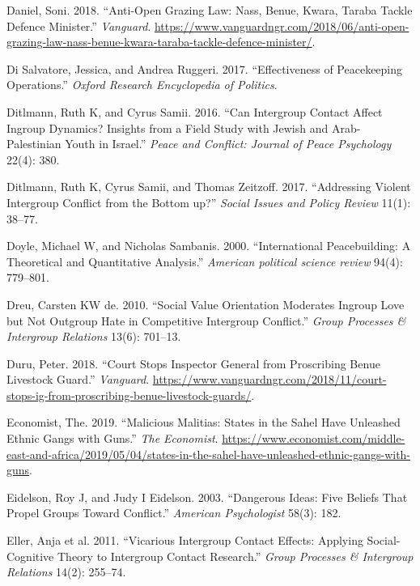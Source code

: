 \documentclass[11pt]{article}
\begin{document}
\hypertarget{ref-daniel2018anti}{}
Daniel, Soni. 2018. ``Anti-Open Grazing Law: Nass, Benue, Kwara, Taraba
Tackle Defence Minister.'' \emph{Vanguard}.
\url{https://www.vanguardngr.com/2018/06/anti-open-grazing-law-nass-benue-kwara-taraba-tackle-defence-minister/}.

\hypertarget{ref-di2017effectiveness}{}
Di Salvatore, Jessica, and Andrea Ruggeri. 2017. ``Effectiveness of
Peacekeeping Operations.'' \emph{Oxford Research Encyclopedia of
Politics}.

\hypertarget{ref-ditlmann2016can}{}
Ditlmann, Ruth K, and Cyrus Samii. 2016. ``Can Intergroup Contact Affect
Ingroup Dynamics? Insights from a Field Study with Jewish and
Arab-Palestinian Youth in Israel.'' \emph{Peace and Conflict: Journal of
Peace Psychology} 22(4): 380.

\hypertarget{ref-ditlmann2017addressing}{}
Ditlmann, Ruth K, Cyrus Samii, and Thomas Zeitzoff. 2017. ``Addressing
Violent Intergroup Conflict from the Bottom up?'' \emph{Social Issues
and Policy Review} 11(1): 38--77.

\hypertarget{ref-doyle2000international}{}
Doyle, Michael W, and Nicholas Sambanis. 2000. ``International
Peacebuilding: A Theoretical and Quantitative Analysis.'' \emph{American
political science review} 94(4): 779--801.

\hypertarget{ref-dreu2010social}{}
Dreu, Carsten KW de. 2010. ``Social Value Orientation Moderates Ingroup
Love but Not Outgroup Hate in Competitive Intergroup Conflict.''
\emph{Group Processes \& Intergroup Relations} 13(6): 701--13.

\hypertarget{ref-duru2018court}{}
Duru, Peter. 2018. ``Court Stops Inspector General from Proscribing
Benue Livestock Guard.'' \emph{Vanguard}.
\url{https://www.vanguardngr.com/2018/11/court-stops-ig-from-proscribing-benue-livestock-guards/}.

\hypertarget{ref-economist2019militias}{}
Economist, The. 2019. ``Malicious Malitias: States in the Sahel Have
Unleashed Ethnic Gangs with Guns.'' \emph{The Economist}.
\url{https://www.economist.com/middle-east-and-africa/2019/05/04/states-in-the-sahel-have-unleashed-ethnic-gangs-with-guns}.

\hypertarget{ref-eidelson2003dangerous}{}
Eidelson, Roy J, and Judy I Eidelson. 2003. ``Dangerous Ideas: Five
Beliefs That Propel Groups Toward Conflict.'' \emph{American
Psychologist} 58(3): 182.

\hypertarget{ref-mazziotta2011vicarious}{}
Eller, Anja et al. 2011. ``Vicarious Intergroup Contact Effects:
Applying Social-Cognitive Theory to Intergroup Contact Research.''
\emph{Group Processes \& Intergroup Relations} 14(2): 255--74.
\end{document}
